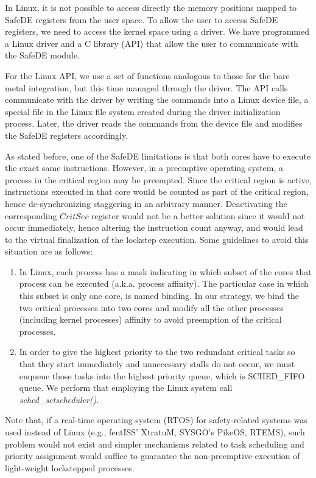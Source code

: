 In Linux, it is not possible to access directly the memory positions mapped to SafeDE registers from the user space. To allow the user to access SafeDE registers, we need to access the kernel space using a driver. We have programmed a Linux driver and a C library (API) that allow the user to communicate with the SafeDE module. 

For the Linux API, we use a set of functions analogous to those for the bare metal integration, but this time managed through the driver. The API calls communicate with the driver by writing the commands into a Linux device file, a special file in the Linux file system created during the driver initialization process. Later, the driver reads the commands from the device file and modifies the SafeDE registers accordingly. 

As stated before, one of the SafeDE limitations is that both cores have to execute the exact same instructions. However, in a preemptive operating system, a process in the critical region may be preempted. Since the critical region is active, instructions executed in that core would be counted as part of the critical region, hence de-synchronizing staggering in an arbitrary manner. Deactivating the corresponding $CritSec$ register would not be a better solution since it would not occur immediately, hence altering the instruction count anyway, and would lead to the virtual finalization of the lockstep execution. 
Some guidelines to avoid this situation are as follows:
\begin{enumerate}
    \item In Linux, each process has a mask indicating in which subset of the cores that process can be executed (a.k.a. process affinity). The particular case in which this subset is only one core, is named binding. In our strategy, we bind the two critical processes into two cores and modify all the other processes (including kernel processes) affinity to avoid preemption of the critical processes.
    \item In order to give the highest priority to the two redundant critical tasks so that they start immediately and unnecessary stalls do not occur, we must enqueue those tasks into the highest priority queue, which is SCHED\_FIFO queue. We perform that employing the Linux system call \textit{sched\_setscheduler()}. 
\end{enumerate}


Note that, if a real-time operating system (RTOS) for safety-related systems was used instead of Linux (e.g., fentISS' XtratuM, SYSGO's PikeOS, RTEMS), such problem would not exist and simpler mechanisms related to task scheduling and priority assignment would suffice to guarantee the non-preemptive execution of light-weight lockstepped processes.


